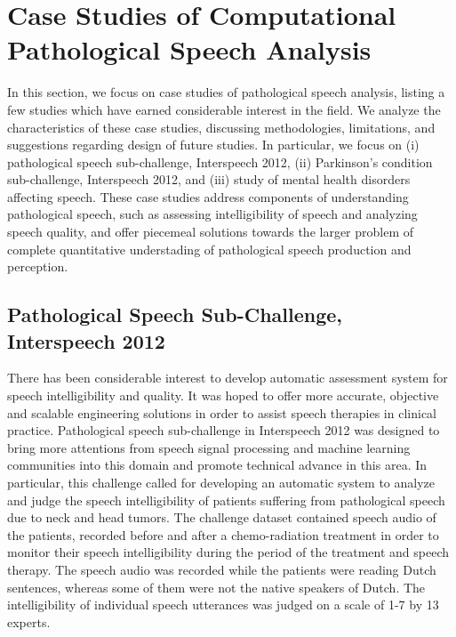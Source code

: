 \documentclass{article}
\begin{document}

\section{Case Studies of Computational Pathological Speech Analysis}
In this section, we focus on case studies of pathological speech analysis, listing a few studies which have earned considerable interest in the field. We analyze the characteristics of these case studies, discussing methodologies, limitations, and suggestions regarding design of future studies.
In particular, we focus on (i) pathological speech sub-challenge, Interspeech 2012, (ii) Parkinson's condition sub-challenge, Interspeech 2012, and (iii) study of mental health disorders affecting speech. 
These case studies address components of understanding pathological speech, such as assessing intelligibility of speech and analyzing speech quality, and offer piecemeal solutions towards the larger problem of complete quantitative understading of pathological speech production and perception.

\subsection{Pathological Speech Sub-Challenge, Interspeech 2012}
There has been considerable interest to develop automatic assessment system for speech intelligibility and quality. It was hoped to offer more accurate, objective and scalable engineering solutions in order to assist speech therapies in clinical practice. Pathological speech sub-challenge in Interspeech 2012 was designed to bring more attentions from speech signal processing and machine learning communities into this domain and promote technical advance in this area.
In particular, this challenge called for developing an automatic system to analyze and judge the speech intelligibility of patients suffering from pathological speech due to neck and head tumors.
The challenge dataset contained speech audio of the patients, recorded before and after a chemo-radiation treatment in order to monitor their speech intelligibility during the period of the treatment and speech therapy.
The speech audio was recorded while the patients were reading Dutch sentences, whereas some of them were not the native speakers of Dutch.
The intelligibility of individual speech utterances was judged on a scale of 1-7 by 13 experts.
\end{document}

